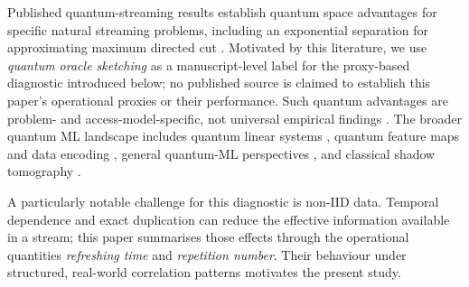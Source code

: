 \documentclass[sensors,article,submit,pdftex,moreauthors]{Definitions/mdpi}
\newcommand{\bigO}{\mathcal{O}}
\providecommand{\DIFadd}[1]{{\protect\color{blue}#1}} %
\providecommand{\DIFdel}[1]{} %
\providecommand{\DIFaddbegin}{} %
\providecommand{\DIFaddend}{} %
\providecommand{\DIFdelbegin}{} %
\providecommand{\DIFdelend}{} %
\begin{document}
\DIFdelbegin \DIFdel{Recent work by }%
\DIFdel{shows that quantum oracle sketching achieves exponential quantum advantages for classification and dimension reduction on massive classical data, using a polylogarithmic-size quantum computer ($\bigO(n)$ qubits for $n = \log_2 N$). For several concrete problemsthe classical memory requirement scales polynomially in $N = 2^n$, yielding an exponential gap; the classical hardness results are task-specific }%
\DIFdelend \DIFaddbegin \DIFadd{Published quantum-streaming results establish quantum space advantages for specific natural streaming problems, including an exponential separation for approximating maximum directed cut }\citep{kallaugher2021streaming, kallaugher2024maxdicut, kallaugher2025designquantum}\DIFadd{. Motivated by this literature, we use }\emph{\DIFadd{quantum oracle sketching}} \DIFadd{as a manuscript-level label for the proxy-based diagnostic introduced below; no published source is claimed to establish this paper's operational proxies or their performance. Such quantum advantages are problem- and access-model-specific, not universal empirical findings }\citep{aaronson2015readthefineprint, tang2019quantum, huang2021powerofdata}\DIFaddend . The broader quantum ML landscape includes \DIFdelbegin \DIFdel{variational algorithms }%
\DIFdel{, NISQ-era }\DIFdelend \DIFaddbegin \DIFadd{quantum linear systems }\citep{harrow2009hhl}\DIFadd{, quantum feature maps and data encoding }\citep{havlicek2019qkernels, schuld2021encoding}\DIFadd{, general quantum-ML }\DIFaddend perspectives \DIFdelbegin %
\DIFdel{, quantum learning theory }%
\DIFdel{, }\DIFdelend \DIFaddbegin \citep{biamonte2017qml, preskill2018nisq, schuld2018supervised, cerezo2021variational}\DIFadd{, }\DIFaddend and classical shadow tomography \citep{huang2020shadows}.

A particularly notable \DIFdelbegin \DIFdel{feature of this framework is its treatment of }\DIFdelend \DIFaddbegin \DIFadd{challenge for this diagnostic is }\DIFaddend non\nobreakdash-IID data. \DIFdelbegin \DIFdel{The framework extends to correlated, non}%
\DIFdel{-IID data via a hierarchical data-generation model in which the quantum sample complexity is multiplied by the }\DIFdelend \DIFaddbegin \DIFadd{Temporal dependence and exact duplication can reduce the effective information available in a stream; this paper summarises those effects through the operational quantities }\emph{\DIFadd{refreshing time}} \DIFadd{and }\DIFaddend \emph{repetition number}\DIFdelbegin \DIFdel{of the data-generation process. However, the practical implications of this robustness }\DIFdelend \DIFaddbegin \DIFadd{. Their behaviour }\DIFaddend under structured, real-world correlation patterns \DIFdelbegin \DIFdel{remain unexplored}\DIFdelend \DIFaddbegin \DIFadd{motivates the present study}\DIFaddend .
\end{document}
